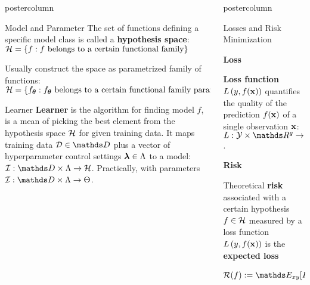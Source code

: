 \documentclass{beamer}
\newlength{\columnheight} %
\begin{document}
\begin{frame}[fragile]{}
\begin{columns}
\begin{column}{.31\textwidth}
\begin{beamercolorbox}[center]{postercolumn}
\begin{minipage}{.98\textwidth}
{\begin{myblock}{Model and Parameter}
    The set of functions defining a specific model class is called a 
    \textbf{hypothesis space}: $\mathcal{H} = \{f: f \text{ belongs to a certain functional family}\}$

    Usually construct the space as parametrized family of functions:
    $\mathcal{H} = \{f_{\bm{\theta}}: f_{\bm{\theta}} \text{ belongs to a certain functional family parameterized by } \bm{\theta}\}$

  \end{myblock}

  \begin{myblock}{Learner}
    \textbf{Learner} is the algorithm for finding model $f$, is a mean of picking the best element from the hypothesis space $\mathcal{H}$
  for given training data.
  It maps training data $\D \in \allDatasets$ plus a vector of hyperparameter control settings $\bm{\lambda} \in \Lambda$ to a model:
  $ \ind: \preimageInducerShort \rightarrow \Hspace$. 
  Practically, with parameters $\ind: \preimageInducerShort \rightarrow \Theta$.
\end{myblock}

}
\end{minipage}
\end{beamercolorbox}
\end{column}


\begin{column}{.31\textwidth}
\begin{beamercolorbox}[center]{postercolumn}
\begin{minipage}{.98\textwidth}
\parbox[t][\columnheight]{\textwidth}{

  \begin{myblock}{Losses and Risk Minimization}
  
  \begin{codebox}
  \textbf{Loss}	
  \end{codebox}
  \textbf{Loss function} $L\left(y, f(\mathbf{x})\right)$ quantifies the quality of the prediction $f(\mathbf{x})$ of a single observation $\mathbf{x}$:
    $L: \Yspace \times \R^g \to \R$.


  \begin{codebox}
  \textbf{Risk}
  \end{codebox}
  Theoretical \textbf{risk} associated with a certain hypothesis $f \in \mathcal{H}$ measured by a loss function $L\left(y, f(\mathbf{x})\right)$ is the \textbf{expected loss}
  $$ \riskf := \E_{xy} [\Lxy] = \int \Lxy \text{d}\Pxy $$
  

\end{myblock}}
\end{minipage}
\end{beamercolorbox}
\end{column}
\end{columns}
\end{frame}
\end{document}
